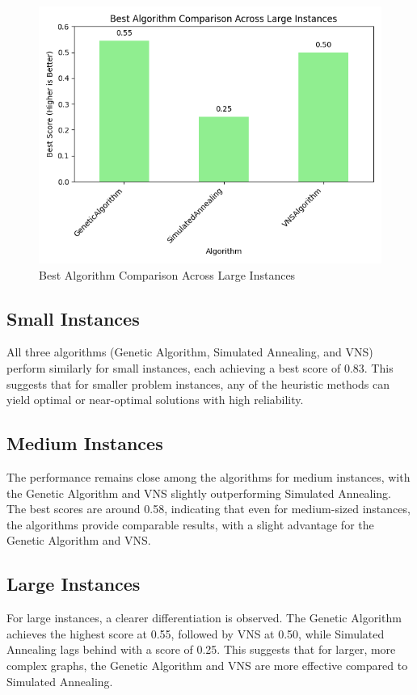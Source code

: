 \documentclass[a4paper,12pt]{article}
\begin{document}
\begin{figure}[H]
\begin{minipage}{0.32\textwidth}
        \centering
        \includegraphics[width=\linewidth]{large_results.png}
        \caption{Best Algorithm Comparison Across Large Instances}
        \label{fig:large_results}
    \end{minipage}
\end{figure}

\subsection{Small Instances}
All three algorithms (Genetic Algorithm, Simulated Annealing, and VNS) perform similarly for small instances, each achieving a best score of 0.83. This suggests that for smaller problem instances, any of the heuristic methods can yield optimal or near-optimal solutions with high reliability.

\subsection{Medium Instances}
The performance remains close among the algorithms for medium instances, with the Genetic Algorithm and VNS slightly outperforming Simulated Annealing. The best scores are around 0.58, indicating that even for medium-sized instances, the algorithms provide comparable results, with a slight advantage for the Genetic Algorithm and VNS.

\subsection{Large Instances}
For large instances, a clearer differentiation is observed. The Genetic Algorithm achieves the highest score at 0.55, followed by VNS at 0.50, while Simulated Annealing lags behind with a score of 0.25. This suggests that for larger, more complex graphs, the Genetic Algorithm and VNS are more effective compared to Simulated Annealing.
\end{document}

